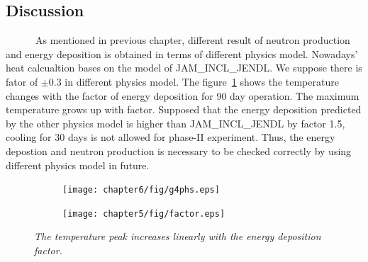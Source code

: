 \subsection{Discussion}
~~~~~~As mentioned in previous chapter, different result of neutron production and energy deposition is obtained in terms of different physics model.
Nowadays' heat calcualtion bases on the model of JAM\_INCL\_JENDL.
We suppose there is fator of $\pm$0.3 in different physics model.
The figure~\ref{5factor} shows the temperature changes with the factor of energy deposition for 90 day operation.
The maximum temperature grows up with factor.
Supposed that the energy deposition predicted by the other physics model is higher than JAM\_INCL\_JENDL by factor 1.5, cooling for 30 days is not allowed for phase-II experiment.
Thus, the energy depostion and neutron production is necessary to be checked correctly by using different physics model in future.
\begin{figure}[H]
 \begin{subfigure}{0.3\textwidth}
 \centering
 \texttt{[image: chapter6/fig/g4phs.eps]}
 \end{subfigure}
 \hspace{0.2\textwidth}
 \begin{subfigure}{0.3\textwidth}
 \centering
 \texttt{[image: chapter5/fig/factor.eps]}
 \end{subfigure}
 \caption{\it The temperature peak increases linearly with the energy deposition factor.}
 \label{5factor}
\end{figure}

